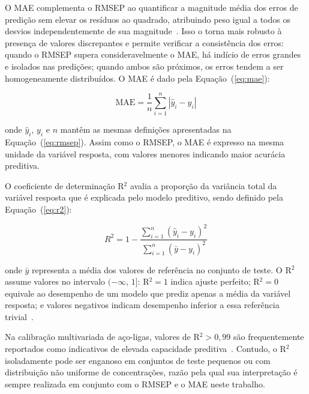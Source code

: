 O \gls{MAE} complementa o \gls{RMSEP} ao quantificar a magnitude 
média dos erros de predição sem elevar os resíduos ao quadrado, 
atribuindo peso igual a todos os desvios independentemente de sua 
magnitude~\cite{hodson2022rmse}. Isso o torna mais robusto 
à presença de valores discrepantes e permite verificar a 
consistência dos erros: quando o \gls{RMSEP} supera 
consideravelmente o \gls{MAE}, há indício de erros grandes e 
isolados nas predições; quando ambos são próximos, os erros tendem 
a ser homogeneamente distribuídos. O \gls{MAE} é dado pela Equação~(\ref{eq:mae}):

\begin{equation}
   \textrm{MAE} = \dfrac{1}{n}\sum_{i=1}^{n}|\widehat{y}_i - y_i|
\label{eq:mae}
\end{equation}

\noindent onde $\widehat{y}_i$, $y_i$ e $n$ mantêm as mesmas 
definições apresentadas na Equação~(\ref{eq:rmsep}). Assim como 
o \gls{RMSEP}, o \gls{MAE} é expresso na mesma unidade da variável 
resposta, com valores menores indicando maior acurácia preditiva.

O coeficiente de determinação R$^2$ avalia a proporção da variância total da variável resposta que é explicada pelo modelo preditivo, sendo definido pela Equação~(\ref{eq:r2}):

\begin{equation}
   R^2 = 1 - \dfrac{\displaystyle\sum_{i=1}^{n}(\widehat{y}_i - y_i)^2}
                   {\displaystyle\sum_{i=1}^{n}(\bar{y} - y_i)^2}
\label{eq:r2}
\end{equation}

\noindent onde $\bar{y}$ representa a média dos valores de referência 
no conjunto de teste. O R$^2$ assume valores no intervalo 
$(-\infty,\, 1]$: R$^2 = 1$ indica ajuste perfeito; R$^2 = 0$ 
equivale ao desempenho de um modelo que prediz apenas a média da 
variável resposta; e valores negativos indicam desempenho inferior 
a essa referência trivial~\cite{ezenarro2025chemometric}.

Na 
calibração multivariada de aço-ligas, valores de R$^2 > 0{,}99$ 
são frequentemente reportados como indicativos de elevada capacidade 
preditiva~\cite{Westad2024,kumari2024,perisdiaz2021}. Contudo, o R$^2$ 
isoladamente pode ser enganoso em conjuntos de teste pequenos ou 
com distribuição não uniforme de concentrações, razão pela qual 
sua interpretação é sempre realizada em conjunto com o \gls{RMSEP} 
e o \gls{MAE} neste trabalho.